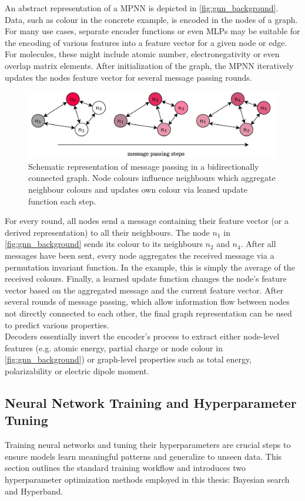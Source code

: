 An abstract representation of a MPNN is depicted in \autoref{fig:gnn_background}. Data, such as colour in the concrete example, is encoded in the nodes of a graph. For many use cases, separate encoder functions or even MLPs may be suitable for the encoding of various features into a feature vector for a given node or edge. For molecules, these might include atomic number, electronegativity or even overlap matrix elements. After initialization of the graph, the MPNN iteratively updates the nodes feature vector for several message passing rounds. 
\begin{figure}[H]
    \centering
    \includegraphics[width=\textwidth]{../fig/background/GNN.pdf}
    \caption[Schematic Message Passing Neural Net]{Schematic representation of message passing in a bidirectionally connected graph. Node colours influence neighbours which aggregate neighbour colours and updates own colour via leaned update function each step.}
    \label{fig:gnn_background}
\end{figure}
For every round, all nodes send a message containing their feature vector (or a derived representation) to all their neighbours. The node $n_1$ in \autoref{fig:gnn_background} sends its colour to its neighbours $n_2$ and $n_4$. After all messages have been sent, every node aggregates the received message via a permutation invariant function. In the example, this is simply the average of the received colours. Finally, a learned update function changes the node's feature vector based on the aggregated message and the current feature vector. After several rounds of message passing, which allow information flow between nodes not directly connected to each other, the final graph representation can be used to predict various properties.\\
Decoders essentially invert the encoder's process to extract either node-level features (e.g. atomic energy, partial charge or node colour in \autoref{fig:gnn_background}) or graph-level properties such as total energy, polarizability or electric dipole moment.

\subsection{Neural Network Training and Hyperparameter Tuning}
\label{subsec:background_ml_training}
Training neural networks and tuning their hyperparameters are crucial steps to ensure models learn meaningful patterns and generalize to unseen data. This section outlines the standard training workflow and introduces two hyperparameter optimization methods employed in this thesis: Bayesian search and Hyperband.

